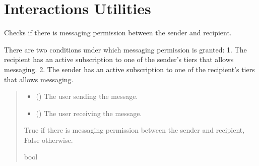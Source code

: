 \documentclass[letterpaper,10pt,english]{sphinxmanual}
\begin{document}
\section{Interactions Utilities}
\label{\detokenize{modules/others:module-interactions.helpers}}\label{\detokenize{modules/others:interactions-utilities}}

\begin{fulllineitems}
\label{\detokenize{modules/others:interactions.helpers.has_messaging_permission}}
\pysigstartsignatures
{}
\pysigstopsignatures
\sphinxAtStartPar
Checks if there is messaging permission between the sender and recipient.

\sphinxAtStartPar
There are two conditions under which messaging permission is granted:
1. The recipient has an active subscription to one of the sender’s tiers that allows messaging.
2. The sender has an active subscription to one of the recipient’s tiers that allows messaging.
\begin{quote}\begin{description}
\begin{itemize}
\item {} 
\sphinxAtStartPar
{} ({\hyperref[\detokenize{modules/models:account.models.CustomUser}]{}}) \textendash{} The user sending the message.

\item {} 
\sphinxAtStartPar
{} ({\hyperref[\detokenize{modules/models:account.models.CustomUser}]{}}) \textendash{} The user receiving the message.

\end{itemize}

\sphinxAtStartPar
True if there is messaging permission between the sender and recipient, False otherwise.

\sphinxAtStartPar
bool

\end{description}\end{quote}

\end{fulllineitems}
\end{document}
